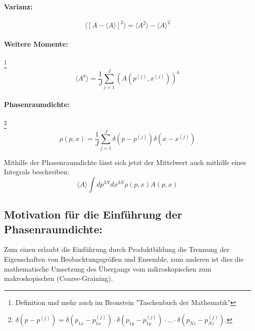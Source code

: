 	\paragraph{Varianz:}
	\[\langle [A - \langle A \rangle]^2 \rangle  = \langle A^2 \rangle - \langle A \rangle^2 \]
	\paragraph{Weitere Momente:}\footnote{Definition und mehr auch im Bronstein "Taschenbuch der Mathematik"}
	\[ \langle A^k \rangle = \frac{1}{J} \sum_{j=1}^{J}(A(p^{(j)},x^{(j)}))^k \]
	\paragraph{Phasenraumdichte:}\footnote{$ \delta(p-p^{(j)}) = \delta(p_{1x}-p_{1x}^{(j)}) \cdot \delta(p_{1y}-p_{1y}^{(j)})\cdot ... \cdot \delta(p_{Nz}-p_{Nz}^{(j)})$.}
	\[ \rho (p,x) = \frac{1}{J} \sum_{j=1}^{J} \delta(p-p^{(j)}) \delta(x-x^{(j)}) \]
	
	\noindent Mithilfe der Phasenraumdichte lässt sich jetzt der Mittelwert auch mithilfe eines Integrals beschreiben: 
	\[ \langle A \rangle \int dp^{3N} dx^{3N} \rho (p,x) A(p,x)\]
	
	\subsection{Motivation für die Einführung der Phasenraumdichte:}
	Zum einen erlaubt die Einführung durch Produktbildung die Trennung der Eigenschaften von Beobachtungsgrößen und Ensemble, zum anderen ist dies die mathematische Umsetzung des Übergangs vom mikroskopischen zum makroskopischen (Coarse-Graining). 
	
	
	
	
